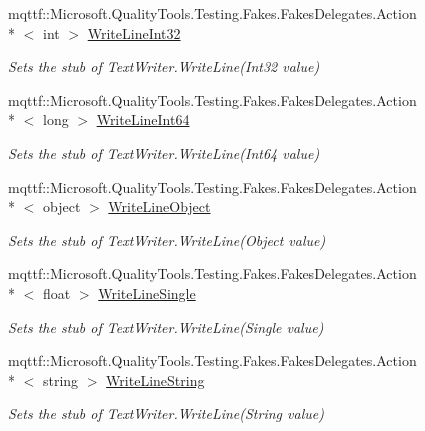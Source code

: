 \begin{DoxyCompactItemize}
mqttf\-::\-Microsoft.\-Quality\-Tools.\-Testing.\-Fakes.\-Fakes\-Delegates.\-Action\\*
$<$ int $>$ \hyperlink{class_system_1_1_i_o_1_1_fakes_1_1_stub_stream_writer_aa1aef5e4e1f1328bf7a2816d1a9d4c5a}{Write\-Line\-Int32}
\begin{DoxyCompactList}\small\item\em Sets the stub of Text\-Writer.\-Write\-Line(\-Int32 value)\end{DoxyCompactList}\item 
mqttf\-::\-Microsoft.\-Quality\-Tools.\-Testing.\-Fakes.\-Fakes\-Delegates.\-Action\\*
$<$ long $>$ \hyperlink{class_system_1_1_i_o_1_1_fakes_1_1_stub_stream_writer_a242ea063122d52c9885131e4d77fe825}{Write\-Line\-Int64}
\begin{DoxyCompactList}\small\item\em Sets the stub of Text\-Writer.\-Write\-Line(\-Int64 value)\end{DoxyCompactList}\item 
mqttf\-::\-Microsoft.\-Quality\-Tools.\-Testing.\-Fakes.\-Fakes\-Delegates.\-Action\\*
$<$ object $>$ \hyperlink{class_system_1_1_i_o_1_1_fakes_1_1_stub_stream_writer_a211c495492cad47f639a77817d754e0b}{Write\-Line\-Object}
\begin{DoxyCompactList}\small\item\em Sets the stub of Text\-Writer.\-Write\-Line(\-Object value)\end{DoxyCompactList}\item 
mqttf\-::\-Microsoft.\-Quality\-Tools.\-Testing.\-Fakes.\-Fakes\-Delegates.\-Action\\*
$<$ float $>$ \hyperlink{class_system_1_1_i_o_1_1_fakes_1_1_stub_stream_writer_af2a2b9ba72906f1477432ea12d9e6abf}{Write\-Line\-Single}
\begin{DoxyCompactList}\small\item\em Sets the stub of Text\-Writer.\-Write\-Line(\-Single value)\end{DoxyCompactList}\item 
mqttf\-::\-Microsoft.\-Quality\-Tools.\-Testing.\-Fakes.\-Fakes\-Delegates.\-Action\\*
$<$ string $>$ \hyperlink{class_system_1_1_i_o_1_1_fakes_1_1_stub_stream_writer_a71f037719c8536f2738809bc03f3123f}{Write\-Line\-String}
\begin{DoxyCompactList}\small\item\em Sets the stub of Text\-Writer.\-Write\-Line(\-String value)\end{DoxyCompactList}\item 

\end{DoxyCompactItemize}
